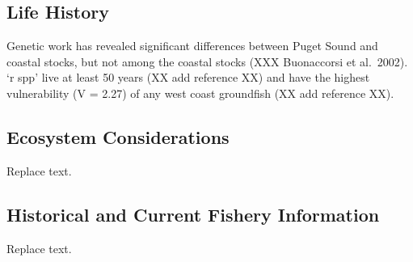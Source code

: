 \documentclass[11pt,
  english,
  a4paper,
]{article}
\begin{document}
\leavevmode\tagmcend\tagstructend\par


\hypertarget{life-history}{%
\subsection{Life History}\label{life-history}}

\leavevmode\tagmcend\tagstructend


Genetic work has revealed significant differences between Puget Sound and coastal stocks, but not among the coastal stocks (XXX Buonaccorsi et al.~2002). `r spp' live at least 50 years (XX add reference XX) and have the highest vulnerability (V = 2.27) of any west coast groundfish (XX add reference XX).

\leavevmode\tagmcend\tagstructend\par


\hypertarget{ecosystem-considerations}{%
\subsection{Ecosystem Considerations}\label{ecosystem-considerations}}

\leavevmode\tagmcend\tagstructend


Replace text.

\leavevmode\tagmcend\tagstructend\par


\hypertarget{historical-and-current-fishery-information}{%
\subsection{Historical and Current Fishery Information}\label{historical-and-current-fishery-information}}

\leavevmode\tagmcend\tagstructend


Replace text.

\leavevmode\tagmcend\tagstructend\par
\end{document}
